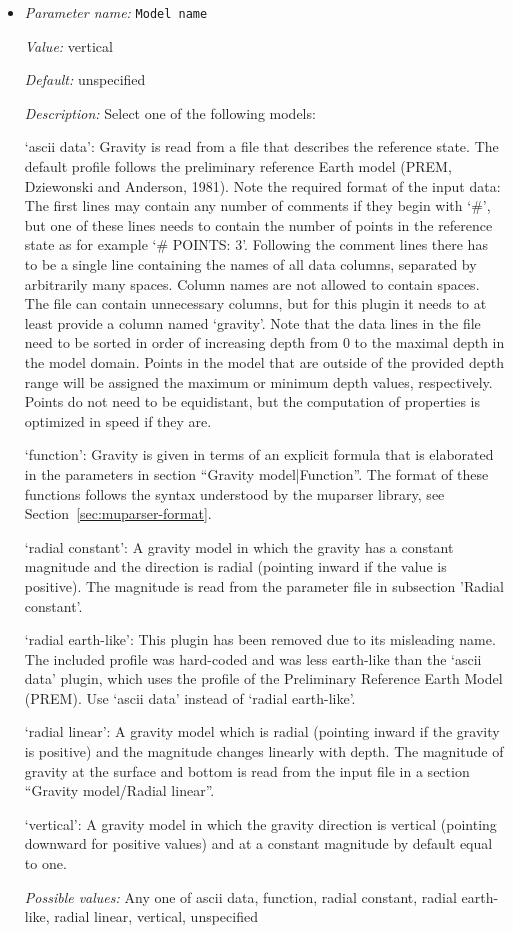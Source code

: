 \begin{itemize}
\item {\it Parameter name:} {\tt Model name}
\label{parameters:Gravity model/Model name}


{\it Value:} vertical


{\it Default:} unspecified


{\it Description:} Select one of the following models:

`ascii data': Gravity is read from a file that describes the reference state. The default profile follows the preliminary reference Earth model (PREM, Dziewonski and Anderson, 1981). Note the required format of the input data: The first lines may contain any number of comments if they begin with `\#', but one of these lines needs to contain the number of points in the reference state as for example `\# POINTS: 3'. Following the comment lines there has to be a single line containing the names of all data columns, separated by arbitrarily many spaces. Column names are not allowed to contain spaces. The file can contain unnecessary columns, but for this plugin it needs to at least provide a column named `gravity'. Note that the data lines in the file need to be sorted in order of increasing depth from 0 to the maximal depth in the model domain. Points in the model that are outside of the provided depth range will be assigned the maximum or minimum depth values, respectively. Points do not need to be equidistant, but the computation of properties is optimized in speed if they are.

`function': Gravity is given in terms of an explicit formula that is elaborated in the parameters in section ``Gravity model|Function''. The format of these functions follows the syntax understood by the muparser library, see Section~\ref{sec:muparser-format}.

`radial constant': A gravity model in which the gravity has a constant magnitude and the direction is radial (pointing inward if the value is positive). The magnitude is read from the parameter file in subsection 'Radial constant'.

`radial earth-like': This plugin has been removed due to its misleading name. The included profile was hard-coded and was less earth-like than the `ascii data' plugin, which uses the profile of the Preliminary Reference Earth Model (PREM). Use `ascii data' instead of `radial earth-like'.

`radial linear': A gravity model which is radial (pointing inward if the gravity is positive) and the magnitude changes linearly with depth. The magnitude of gravity at the surface and bottom is read from the input file in a section ``Gravity model/Radial linear''.

`vertical': A gravity model in which the gravity direction is vertical (pointing downward for positive values) and at a constant magnitude by default equal to one.


{\it Possible values:} Any one of ascii data, function, radial constant, radial earth-like, radial linear, vertical, unspecified
\end{itemize}



